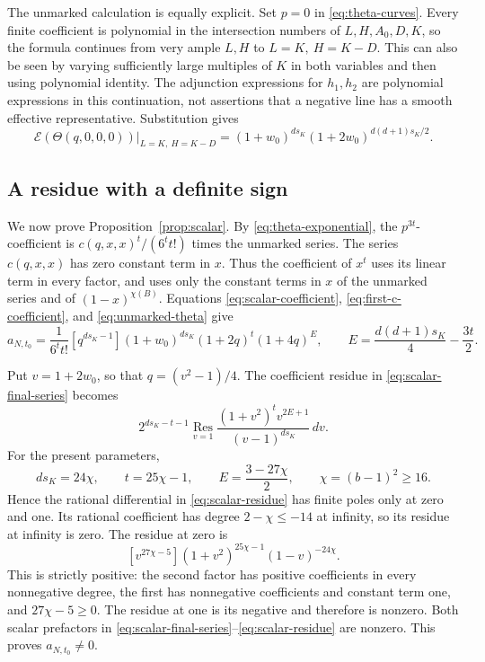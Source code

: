 The unmarked calculation is equally explicit.
Set \(p=0\) in \eqref{eq:theta-curves}.
Every finite coefficient is polynomial in the intersection numbers
of \(L,H,A_0,D,K\), so the formula continues from very ample
\(L,H\) to \(L=K,\ H=K-D\).
This can also be seen by varying sufficiently large multiples of
\(K\) in both variables and then using polynomial identity.
The adjunction expressions for \(h_1,h_2\) are polynomial
expressions in this continuation, not assertions that a negative
line has a smooth effective representative.
Substitution gives
\begin{equation}\label{eq:unmarked-theta}
 \mathcal E(\Theta(q,0,0,0))
 \big|_{L=K,\ H=K-D}
 =
 (1+w_0)^{ds_K}
 (1+2w_0)^{d(d+1)s_K/2}.
\end{equation}

\subsection{A residue with a definite sign}

We now prove Proposition~\ref{prop:scalar}.
By \eqref{eq:theta-exponential}, the \(p^{3t}\)-coefficient is
\(c(q,x,x)^t/(6^t t!)\) times the unmarked series.
The series \(c(q,x,x)\) has zero constant term in \(x\).
Thus the coefficient of \(x^t\) uses its linear term in every factor,
and uses only the constant terms in \(x\) of the unmarked series and
of \((1-x)^{\chi(B)}\).
Equations \eqref{eq:scalar-coefficient},
\eqref{eq:first-c-coefficient}, and \eqref{eq:unmarked-theta} give
\begin{equation}\label{eq:scalar-final-series}
 a_{N,t_0}
 =
 \frac{1}{6^t t!}
 [q^{ds_K-1}]
 (1+w_0)^{ds_K}(1+2q)^t(1+4q)^E,
 \qquad
 E=\frac{d(d+1)s_K}{4}-\frac{3t}{2}.
\end{equation}

Put \(v=1+2w_0\), so that \(q=(v^2-1)/4\).
The coefficient residue in \eqref{eq:scalar-final-series} becomes
\begin{equation}\label{eq:scalar-residue}
 2^{ds_K-t-1}
 \operatorname*{Res}_{v=1}
 \frac{(1+v^2)^t v^{2E+1}}{(v-1)^{ds_K}}\,dv.
\end{equation}
For the present parameters,
\[
 ds_K=24\chi,\qquad
 t=25\chi-1,\qquad
 E=\frac{3-27\chi}{2},\qquad
 \chi=(b-1)^2\geq16.
\]
Hence the rational differential in \eqref{eq:scalar-residue} has
finite poles only at zero and one.
Its rational coefficient has degree \(2-\chi\leq-14\) at infinity,
so its residue at infinity is zero.
The residue at zero is
\[
 [v^{27\chi-5}]
 (1+v^2)^{25\chi-1}(1-v)^{-24\chi}.
\]
This is strictly positive: the second factor has positive
coefficients in every nonnegative degree, the first has nonnegative
coefficients and constant term one, and \(27\chi-5\geq0\).
The residue at one is its negative and therefore is nonzero.
Both scalar prefactors in
\eqref{eq:scalar-final-series}--\eqref{eq:scalar-residue} are nonzero.
This proves \(a_{N,t_0}\neq0\).

